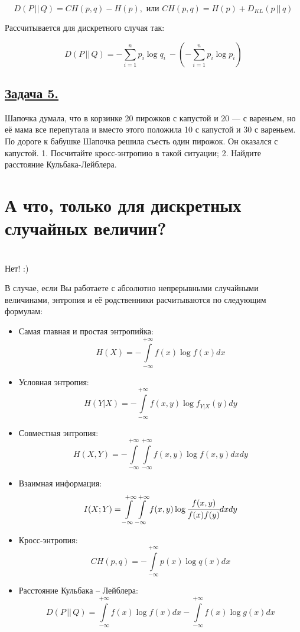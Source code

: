     \[D(P\, ||\, Q)= CH(p,q) - H(p), \text{ или } CH(p, q)=H(p)+D_{KL}(p\, || \, q)\]
    
    Рассчитывается для дискретного случая так:

    \[D(P\, ||\, Q)=  - \sum\limits_{i=1}^n p_i\log q_i\ - ( - \sum\limits_{i=1}^n p_i\log p_i)\]



\subsection*{\hyperref[sec:sol_problem5]{Задача 5.}}\label{sec:problem5} Шапочка думала, что в корзинке 20 пирожков с капустой и 20 — с вареньем, но её мама все перепутала и вместо этого положила 10 с капустой и 30 с вареньем. По дороге к бабушке Шапочка решила съесть один пирожок. Он оказался с капустой. 
1.	Посчитайте кросс-энтропию в такой ситуации;
2.	Найдите расстояние Кульбака-Лейблера.

\section*{А что, только для дискретных случайных величин?}~\
\\

Нет! :)

В случае, если Вы работаете с абсолютно непрерывными случайными величинами, энтропия и её родственники расчитываются по следующим формулам:
\begin{itemize}
    \item Самая главная и простая энтропийка:
    \[H(X)=-\int\limits_{-\infty}^{+\infty} f(x)\log f(x)dx \]
    \item Условная энтропия:
    \[H(Y|X)=-\int\limits_{-\infty}^{+\infty} f(x, y)\log f_{Y|X}(y)dy \]
    \item Совместная энтропия:
    \[H(X, Y)=-\int\limits_{-\infty}^{+\infty} \int\limits_{-\infty}^{+\infty} f(x, y)\log f(x, y)dxdy \]
    \item Взаимная информация:
    \[I(X; Y)=\int\limits_{-\infty}^{+\infty} \int\limits_{-\infty}^{+\infty} f(x, y) \log \cfrac{f(x, y)}{f(x)f(y)}dxdy \]
    \item Кросс-энтропия:
    \[CH(p, q)=-\int\limits_{-\infty}^{+\infty}p(x)\log q(x) dx \]
    \item Расстояние Кульбака -- Лейблера:
    \[D(P\, ||\, Q)=\int\limits_{-\infty}^{+\infty} f(x)\log f(x)dx -\int\limits_{-\infty}^{+\infty} f(x)\log g(x)dx  \]
\end{itemize}

